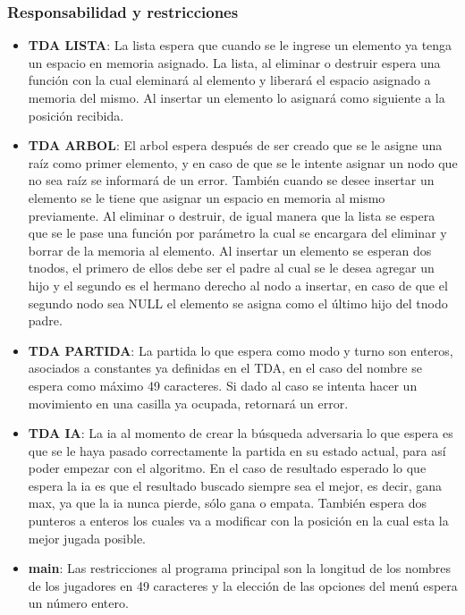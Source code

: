 \documentclass[12pt,a4paper]{article}
\begin{document}
\subsubsection{Responsabilidad y restricciones}
\begin{itemize}
    \item {\bf TDA LISTA}: La lista espera que cuando se le ingrese un elemento ya tenga un espacio en memoria asignado. La lista, al eliminar o destruir espera una funci\'on con la cual eleminar\'a al elemento y liberar\'a el espacio asignado a memoria del mismo. Al insertar un elemento lo asignar\'a como siguiente a la posici\'on recibida.
    \item {\bf TDA ARBOL}: El arbol espera despu\'es de ser creado que se le asigne una ra\'iz como primer elemento, y en caso de que se le intente asignar un nodo que no sea ra\'iz se informar\'a de un error. Tambi\'en cuando se desee insertar un elemento se le tiene que asignar un espacio en memoria al mismo previamente. Al eliminar o destruir, de igual manera que la lista se espera que se le pase una funci\'on por par\'ametro la cual se encargara del eliminar y borrar de la memoria al elemento. Al insertar un elemento se esperan dos tnodos, el primero de ellos debe ser el padre al cual se le desea agregar un hijo y el segundo es el hermano derecho al nodo a insertar, en caso de que el segundo nodo sea NULL el elemento se asigna como el \'ultimo hijo del tnodo padre.
    \item {\bf TDA PARTIDA}: La partida lo que espera como modo y turno son enteros, asociados a constantes ya definidas en el TDA, en el caso del nombre se espera como m\'aximo 49 caracteres. Si dado al caso se intenta hacer un movimiento en una casilla ya ocupada, retornar\'a un error.
    \item {\bf TDA IA}: La ia al momento de crear la b\'usqueda adversaria lo que espera es que se le haya pasado correctamente la partida en su estado actual, para as\'i poder empezar con el algoritmo. En el caso de resultado esperado lo que espera la ia es que el resultado buscado siempre sea el mejor, es decir, gana max, ya que la ia nunca pierde, s\'olo gana o empata. Tambi\'en espera dos punteros a enteros los cuales va a modificar con la posici\'on en la cual esta la mejor jugada posible.
    \item {\bf main}: Las restricciones al programa principal son la longitud de los nombres de los jugadores en 49 caracteres y la elecci\'on de las opciones del men\'u espera un n\'umero entero.
\end{itemize}
\end{document}
